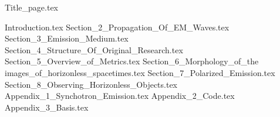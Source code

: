 \documentclass[12pt]{article}
\numberwithin{equation}{section}
\numberwithin{figure}{section}
\begin{document}
\lfoot{}
{Title_page.tex}
\lfoot{}
\tableofcontents
\listoffigures
\listoftables
\newpage
\lfoot{}

\nocite{EHT_M87_I,
		EHT_M87_II,
		EHT_M87_III,
		EHT_M87_IV,
		EHT_M87_V,
		EHT_M87_VI,
		EHT_M87_VII,
		EHT_M87_VIII,
		EHT_M87_IX,
		EHT_SGR_I,
		EHT_SGR_II,
		EHT_SGR_III,
		EHT_SGR_IV,
		EHT_SGR_V,
		EHT_SGR_VI,
		EHT_SGR_VII,
		EHT_SGR_VIII}

{Introduction.tex}
\newpage
\lfoot{}
{Section_2_Propagation_Of_EM_Waves.tex}
\newpage
\lfoot{}
{Section_3_Emission_Medium.tex}
\newpage
\lfoot{}
{Section_4_Structure_Of_Original_Research.tex}
\newpage
\lfoot{}
{Section_5_Overview_of_Metrics.tex}
\newpage
\lfoot{}
{Section_6_Morphology_of_the images_of_horizonless_spacetimes.tex}
\newpage
\lfoot{}
{Section_7_Polarized_Emission.tex}
\newpage
\lfoot{}
{Section_8_Observing_Horizonless_Objects.tex}
\newpage
\lfoot{}
{Appendix_1_Synchotron_Emission.tex}
\lfoot{}
\newpage
{Appendix_2_Code.tex}
\lfoot{}
\newpage
{Appendix_3_Basis.tex}
\lfoot{}
\newpage



\end{document}
